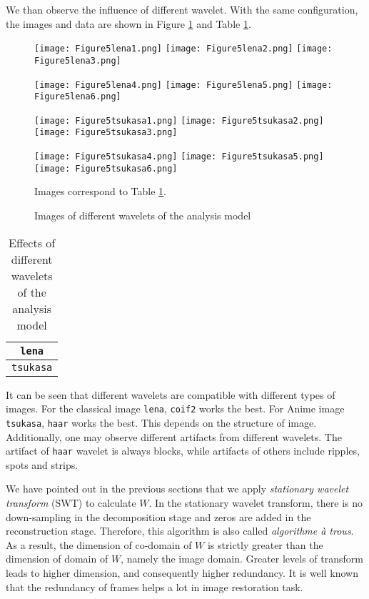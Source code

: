 \documentclass[english, nochinese]{pnote}
\begin{document}
We than observe the influence of different wavelet. With the same configuration, the images and data are shown in Figure \ref{Fig:AnaWav} and Table \ref{Tbl:AnaWav}.

\begin{figure}[htbp]
{
\centering

\texttt{[image: Figure5lena1.png]}
\texttt{[image: Figure5lena2.png]}
\texttt{[image: Figure5lena3.png]}

\texttt{[image: Figure5lena4.png]}
\texttt{[image: Figure5lena5.png]}
\texttt{[image: Figure5lena6.png]}

\texttt{[image: Figure5tsukasa1.png]}
\texttt{[image: Figure5tsukasa2.png]}
\texttt{[image: Figure5tsukasa3.png]}

\texttt{[image: Figure5tsukasa4.png]}
\texttt{[image: Figure5tsukasa5.png]}
\texttt{[image: Figure5tsukasa6.png]}

\caption{Images of different wavelets of the analysis model}
\label{Fig:AnaWav}
}
{
\footnotesize Images correspond to Table \ref{Tbl:AnaWav}.
}
\end{figure}

\begin{table}[htbp]
\centering
\begin{tabular}{|c|c|c|c|c|c|c|}
\hline
\multicolumn{7}{|c|}{\texttt{lena}} \\
\hline

\multicolumn{7}{|c|}{\texttt{tsukasa}} \\
\hline

\end{tabular}
\caption{Effects of different wavelets of the analysis model}
\label{Tbl:AnaWav}
\end{table}

It can be seen that different wavelets are compatible with different types of images. For the classical image \verb"lena", \verb"coif2" works the best. For Anime image \verb"tsukasa", \verb"haar" works the best. This depends on the structure of image. Additionally, one may observe different artifacts from different wavelets. The artifact of \verb"haar" wavelet is always blocks, while artifacts of others include ripples, spots and strips.

We have pointed out in the previous sections that we apply \emph{stationary wavelet transform} (SWT) to calculate $W$. In the stationary wavelet transform, there is no down-sampling in the decomposition stage and zeros are added in the reconstruction stage. Therefore, this algorithm is also called \emph{algorithme \`a trous}. As a result, the dimension of co-domain of $W$ is strictly greater than the dimension of domain of $W$, namely the image domain. Greater levels of transform leads to higher dimension, and consequently higher redundancy. It is well known that the redundancy of frames helps a lot in image restoration task.
\end{document}
